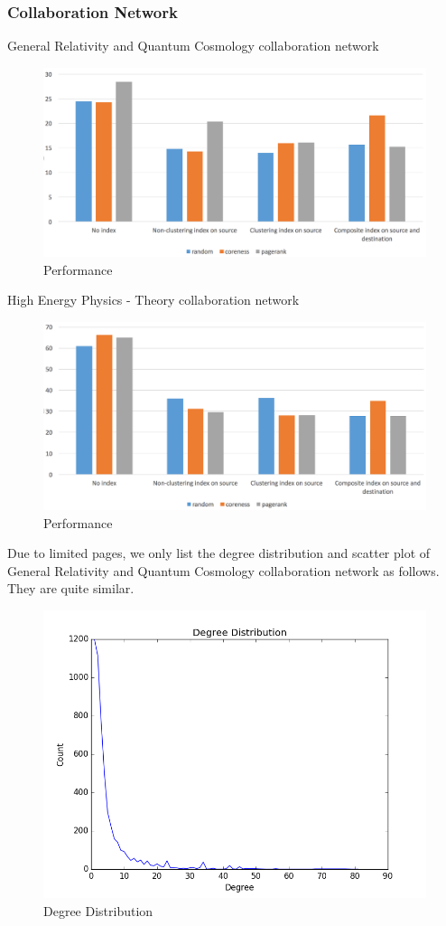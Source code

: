 \subsubsection{Collaboration Network}
General Relativity and Quantum Cosmology collaboration network
\begin{figure}[H]
\centering
\includegraphics[width=0.8\linewidth]{co}
\caption{Performance}
\end{figure}
High Energy Physics - Theory collaboration network
\begin{figure}[H]
\centering
\includegraphics[width=0.8\linewidth]{ca}
\caption{Performance}
\end{figure}
Due to limited pages, we only list the degree distribution and scatter plot of General Relativity and Quantum Cosmology collaboration network as follows. They are quite similar.

\begin{figure}[H]
\centering
\includegraphics[width=0.6\linewidth]{ca_degree}
\caption{Degree Distribution}
\end{figure}

